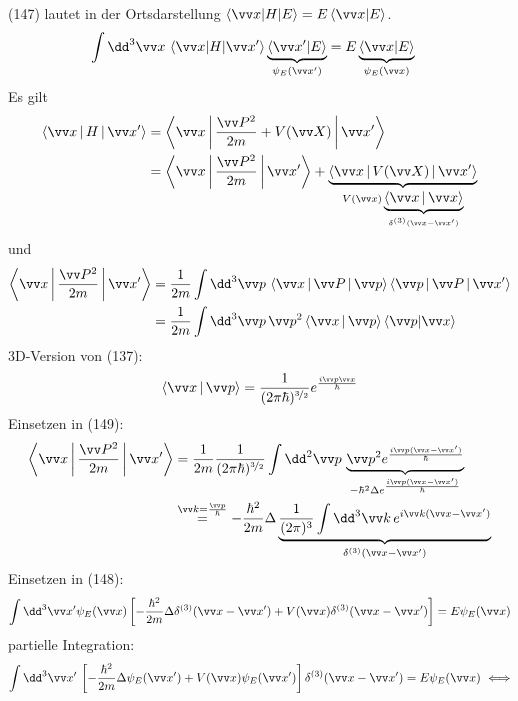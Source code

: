 \documentclass[a4paper]{scrartcl}
\begin{document}
{(147) lautet in der Ortsdarstellung $\braket{ \vv x | H | E} = E \braket{ \vv x | E}$.
\begin{align}
\int \dd^3 \vv x \, \braket{ \vv x | H | \vv x'} \underbrace{ \braket{\vv x ' | E}}_{\psi_E(\vv x')} & = E \underbrace{ \braket{ \vv x | E}}_{\psi_E(\vv x)}
\end{align}
Es gilt
\begin{align*}
\Braket{ \vv x | H | \vv x'} & = \Braket{ \vv x| \frac{ \vv P^2}{2m} + V( \vv X) | \vv x'} \\
& = \Braket{ \vv x | \frac{ \vv P^2}{2m} | \vv x'} + \underbrace{\Braket{ \vv x | V(\vv X) | \vv x'}}_{V(\vv x) \underbrace{\Braket{ \vv x | \vv x }}_{\delta^{(3)}(\vv x - \vv x')}}
\end{align*}
und
\begin{align}
\begin{split}
\Braket{ \vv x | \frac{ \vv P^2}{2m} | \vv x'} & = \frac1{2m} \int \dd^3 \vv p \, \Braket{ \vv x | \vv P | \vv p }\Braket{ \vv p | \vv P | \vv x'} \\
& = \frac1{2m} \int \dd^3 \vv p \, \vv p^2 \Braket{ \vv x | \vv p }\braket{ \vv p | \vv x}
\end{split}
\end{align}
3D-Version von (137):
\begin{align} 
\Braket{ \vv x | \vv p } = \frac1{(2 \pi \hbar)^{\nicefrac32}} e^{\frac{i \vv p \vv x}{\hbar}}
\end{align}
Einsetzen in (149):
\begin{align}
\begin{split}
\Braket{ \vv x | \frac{ \vv P^2}{2m} | \vv x' } & = \frac1{2m} \frac1{(2\pi \hbar)^{\nicefrac32}} \int \dd^2 \vv p \, \underbrace{ \vv p^2 e^{\frac{ i \vv p ( \vv x  - \vv x')} \hbar}}_{- \hbar^2 \Delta e^{\frac{i \vv p ( \vv x - \vv x')}\hbar}} \\
& \stackrel{ \vv k = \frac{\vv p}{\hbar}}=  - \frac{\hbar^2}{2m} \Delta\underbrace{ \frac1{(2\pi)^3} \int \dd^3 \vv k \, e^{i \vv k ( \vv x - \vv x')}}_{\delta^{(3)}(\vv x - \vv x')}
\end{split}
\end{align}
Einsetzen in (148):
$$\int \dd^3 \vv x' \psi_E(\vv x) \left[ - \frac{\hbar^2}{2m} \Delta \delta^{(3)} (\vv x - \vv x') + V( \vv x) \delta^{(3)} (\vv x - \vv x') \right] = E \psi_E(\vv x)$$
partielle Integration:
\begin{align}
\int \dd^3 \vv x' \, \left[ - \frac{\hbar^2}{2m} \Delta \psi_E( \vv x') + V(\vv x) \psi_E(\vv x') \right] \delta^{(3)}(\vv x - \vv x') & = E \psi_E(\vv x) \ \Longleftrightarrow \notag \\

\end{align}}
\end{document}
